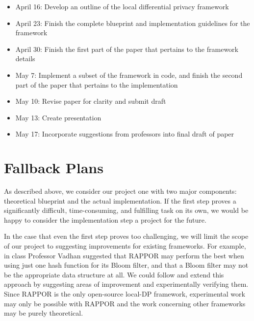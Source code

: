 \documentclass[12pt]{article}
\begin{document}
\begin{itemize}
    \item April 16: Develop an outline of the local differential privacy framework
    \item April 23: Finish the complete blueprint and implementation guidelines for the framework
    \item April 30: Finish the first part of the paper that pertains to the framework details
    \item May 7: Implement a subset of the framework in code, and finish the second part of the paper that pertains to the implementation
    \item May 10: Revise paper for clarity and submit draft
    \item May 13: Create presentation
    \item May 17: Incorporate suggestions from professors into final draft of paper
\end{itemize}

\section*{Fallback Plans}

\noindent

As described above, we consider our project one with two major components: theoretical blueprint and the actual implementation. If the first step proves a significantly difficult, time-consuming, and fulfilling task on its own, we would be happy to consider the implementation step a project for the future.

\medskip

In the case that even the first step proves too challenging, we will limit the scope of our project to suggesting improvements for existing frameworks. For example, in class Professor Vadhan suggested that RAPPOR may perform the best when using just one hash function for its Bloom filter, and that a Bloom filter may not be the appropriate data structure at all. We could follow and extend this approach by suggesting areas of improvement and experimentally verifying them. Since RAPPOR is the only open-source local-DP framework, experimental work may only be possible with RAPPOR and the work concerning other frameworks may be purely theoretical.


\end{document}
